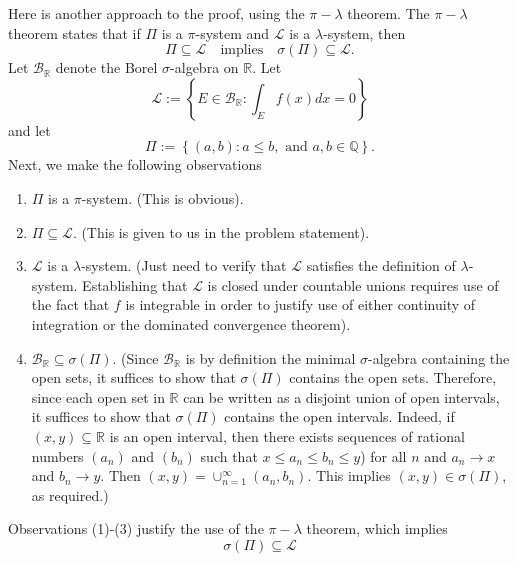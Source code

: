 \documentclass{exam}
\theoremstyle{problemstyle}
\newcommand{\1}[1]{\textbf{1}_{\left[#1\right]}} %
\begin{document}
\begin{questions}
\begin{solution}
Here is another approach to the proof, using the $\pi-\lambda$ theorem. The
$\pi-\lambda$ theorem states that if $\Pi$ is a $\pi$-system and $\mathcal{L}$
is a $\lambda$-system, then
\begin{equation*}
  \Pi\subseteq \mathcal{L}
  \quad \text{implies} \quad
  \sigma(\Pi) \subseteq \mathcal{L}.
\end{equation*}
Let $\mathcal{B}_{\mathbb{R}}$ denote the Borel $\sigma$-algebra on
$\mathbb{R}$. Let
\begin{equation*}
  \mathcal{L} 
  := \left\{ E \in  \mathcal{B}_{\mathbb{R}} :  \int_{E}f(x)dx  = 0 \right\}
\end{equation*}
and let 
\begin{equation*}
  \Pi := \left\{(a,b):a \leq b, \text{ and } a,b\in \mathbb{Q}\right\}.
\end{equation*}
Next, we make the following observations
\begin{enumerate}
  \item $\Pi$ is a $\pi$-system. (This is obvious).
  \item $\Pi\subseteq \mathcal{L}$. (This is given to us in the problem
  statement).
  \item $\mathcal{L}$ is a $\lambda$-system. (Just need to verify that
  $\mathcal{L}$ satisfies the definition of $\lambda$-system. Establishing that
  $\mathcal{L}$ is closed under countable unions requires use of the fact that
  $f$ is integrable in order to justify use of either continuity of integration
  or the dominated convergence theorem).
  \item $  \mathcal{B}_{\mathbb{R}}\subseteq \sigma(\Pi)$. (Since
  $\mathcal{B}_{\mathbb{R}}$ is by definition the minimal $\sigma$-algebra
  containing the open sets, it suffices to show that $\sigma(\Pi)$ contains the
  open sets. Therefore, since each open set in $\mathbb{R}$ can be written as a
  disjoint union of open intervals, it suffices to show that $\sigma(\Pi)$
  contains the open intervals. Indeed, if $(x,y)\subseteq \mathbb{R}$ is an open
  interval, then there exists sequences of rational numbers $(a_{n})$ and
  $(b_{n})$ such that $x\leq a_{n}\leq b_{n}\leq y$) for all $n$ and
  $a_{n}\to x$ and $b_{n}\to y$. Then $(x,y)= \cup_{n=1}^{\infty}(a_{n},b_{n})$.
  This implies $(x,y)\in \sigma(\Pi)$, as required.)
\end{enumerate}
Observations (1)-(3) justify the use of the $\pi-\lambda$ theorem, which implies
\begin{equation*}
  \sigma(\Pi)\subseteq \mathcal{L}
\end{equation*}

\end{solution}
\end{questions}
\end{document}
